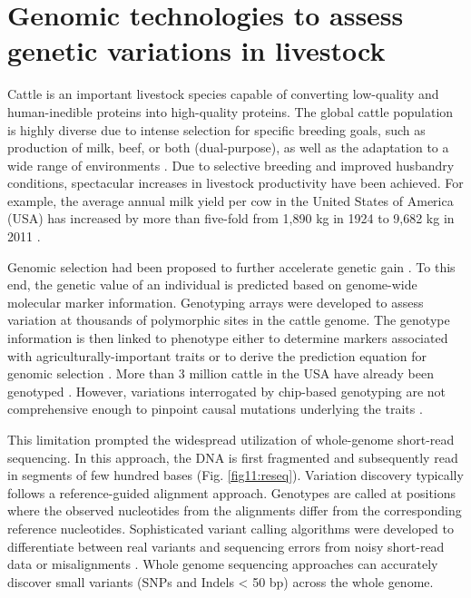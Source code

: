 \documentclass[../main.tex]{subfiles}
\begin{document}
\fi


\graphicspath{{figure/}{../figure/}}

\newpage
\onehalfspacing

\linespread{1.25}
\setlength{\parskip}{\baselineskip}

\normalsize

\section{Genomic technologies to assess genetic variations in livestock}

Cattle is an important livestock species capable of converting low-quality and human-inedible proteins into high-quality proteins. The global cattle population is highly diverse due to intense selection for specific breeding goals, such as production of milk, beef, or both (dual-purpose), as well as the adaptation to a wide range of environments \citep{zhang2020evolution}. Due to selective breeding and improved husbandry conditions, spectacular increases in livestock productivity have been achieved. For example, the average annual milk yield per cow in the United States of America (USA) has increased by more than five-fold from 1,890 kg in 1924 to 9,682 kg in 2011 \citep{georges2019harnessing}. 

Genomic selection had been proposed to further accelerate genetic gain \citep{meuwissen2001prediction}. To this end, the genetic value of an individual is predicted based on genome-wide molecular marker information. Genotyping arrays were developed to assess variation at thousands of polymorphic sites in the cattle genome. The genotype information is then linked to phenotype either to determine markers associated with agriculturally-important traits \citep{goddard2009mapping} or to derive the prediction equation for genomic selection \citep{meuwissen2001prediction}. More than 3 million cattle in the USA have already been genotyped \citep{wiggans2017genomic}. However, variations interrogated by chip-based genotyping  are  not comprehensive enough  to pinpoint causal mutations underlying the traits \citep{pausch2017evaluation}.

This limitation prompted the widespread utilization of whole-genome short-read sequencing. In this approach, the DNA is first fragmented and subsequently read in segments of few hundred bases (Fig. \ref{fig11:reseq}). Variation discovery typically follows a reference-guided alignment approach. Genotypes are called at positions where the observed nucleotides from the alignments differ from the corresponding reference nucleotides. Sophisticated variant calling algorithms were developed to differentiate between real variants and sequencing errors from noisy short-read data or misalignments \citep{depristo2011framework}. Whole genome sequencing approaches can accurately discover small variants (SNPs and Indels < 50 bp) across the whole genome. 
\end{document}
